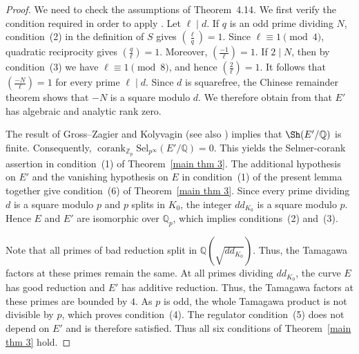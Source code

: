 \documentclass[12pt]{amsart}
\newcommand{\Z}{\mathbb{Z}}
\newcommand{\Q}{\mathbb{Q}}
\newcommand{\Sel}{\mathrm{Sel}}
\newcommand{\op}[1]{\operatorname{#1}}
\numberwithin{equation}{section}
\begin{document}
\begin{proof}
We need to check the assumptions of Theorem~4.14. We first verify the
condition required in order to apply \cite[Theorem~4.3]{kriz-li}. Let
$\ell\mid d$. If $q$ is an odd prime dividing $N$, condition~(2) in
the definition of $S$ gives $\left(\frac{\ell}{q}\right)=1$.
Since $\ell\equiv 1\pmod 4$, quadratic reciprocity gives $\left(\frac{q}{\ell}\right)=1$.
Moreover, $\left(\frac{-1}{\ell}\right)=1$. If $2\mid N$, then by condition~(3) we have
$\ell\equiv1\pmod 8$, and hence $\left(\frac{2}{\ell}\right)=1$.
It follows that $\left(\frac{-N}{\ell}\right)=1$ for every prime $\ell\mid d$. Since $d$ is squarefree, the Chinese
remainder theorem shows that $-N$ is a square modulo $d$. We therefore
obtain from \cite[Theorem~4.3]{kriz-li} that $E'$ has algebraic and
analytic rank zero.

The result of Gross--Zagier and Kolyvagin \cite{gross-zagier,kolyvagin}
(see also \cite[Theorem~2.4]{Bur22}) implies that
$\Sh(E'/\Q)$ is finite. Consequently,
$\op{corank}_{\Z_p}\Sel_{p^\infty}(E'/\Q)=0$. This yields the
Selmer-corank assertion in condition~(1) of Theorem~\ref{main thm 3}.
The additional hypothesis on $E'$ and the vanishing hypothesis on $E$
in condition~(1) of the present lemma together give condition~(6) of
Theorem~\ref{main thm 3}. Since every prime dividing $d$ is a square
modulo $p$ and $p$ splits in $K_0$, the integer $dd_{K_0}$ is a
square modulo $p$. Hence $E$ and $E'$ are isomorphic over $\Q_p$,
which implies conditions~(2) and~(3).

Note that all primes of bad reduction split in
$\Q(\sqrt{dd_{K_0}})$. Thus, the Tamagawa factors at these primes
remain the same. At all primes dividing $dd_{K_0}$, the curve $E$
has good reduction and $E'$ has additive reduction. Thus, the
Tamagawa factors at these primes are bounded by $4$. As $p$ is odd,
the whole Tamagawa product is not divisible by $p$, which proves
condition~(4). The regulator condition~(5) does not depend on $E'$
and is therefore satisfied. Thus all six conditions of
Theorem~\ref{main thm 3} hold.
\end{proof}
\end{document}
